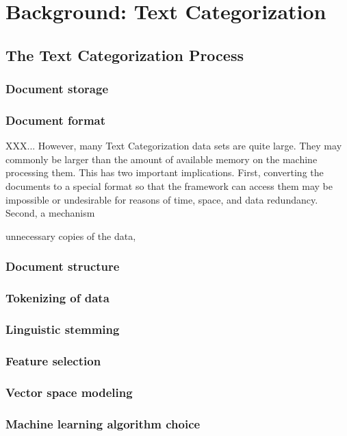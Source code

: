 
\chapter{Background: Text Categorization}
\label{background-tc}

\section{The Text Categorization Process}
\subsection{Document storage}
\label{Document storage}

\subsection{Document format}
\label{Document format}

XXX... However, many Text Categorization data sets are quite large.  They may
commonly be larger than the amount of available memory on the machine
processing them.  This has two important implications.  First,
converting the documents to a special format so that the framework can
access them may be impossible or undesirable for reasons of time,
space, and data redundancy.  Second, a mechanism 

unnecessary copies of the data, 

\subsection{Document structure}
\subsection{Tokenizing of data}
\subsection{Linguistic stemming}
\subsection{Feature selection}
\subsection{Vector space modeling}
\subsection{Machine learning algorithm choice}
